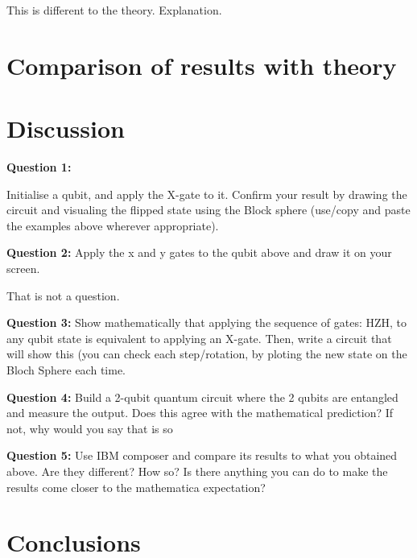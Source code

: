 This is different to the theory. Explanation.

\section{Comparison of results with theory}
\section{Discussion}
\textbf{Question 1:}

Initialise a qubit, and apply the X-gate to it. Confirm your result by drawing the circuit and visualing the flipped state using the Block sphere (use/copy and paste the examples above wherever appropriate).


\textbf{Question 2:}
Apply the x and y gates to the qubit above and draw it on your screen.

That is not a question.

\textbf{Question 3:}
Show mathematically that applying the sequence of gates: HZH, to any qubit state is equivalent to applying an X-gate. Then, write a circuit that will show this (you can check each step/rotation, by ploting the new state on the Bloch Sphere each time.


\textbf{Question 4:}
Build a 2-qubit quantum circuit where the 2 qubits are entangled and measure the output. Does this agree with the mathematical prediction? If not, why would you say that is so

\textbf{Question 5:}
Use IBM composer and compare its results to what you obtained above. Are they different? How so? Is there anything you can do to make the results come closer to the mathematica expectation?

\section{Conclusions}